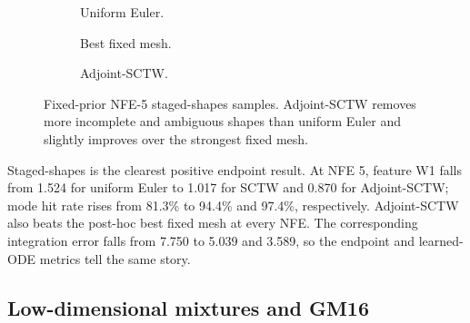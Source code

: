 \begin{table}[t]
  \centering
  \caption{Staged-shapes easy benchmark; feature W1 is lower better. Best fixed is the
  post-hoc minimum over the six early/late/symmetric power meshes and two fixed VSFM meshes at each
  NFE, so it is a deliberately favorable comparator rather than one deployable preselected mesh.}
  \label{tab:staged}
  \resizebox{\linewidth}{!}{%
  }
\end{table}

\begin{figure}[t]
  \centering
  \begin{subfigure}{0.31\linewidth}
    \centering
    \caption{Uniform Euler.}
  \end{subfigure}
  \begin{subfigure}{0.31\linewidth}
    \centering
    \caption{Best fixed mesh.}
  \end{subfigure}
  \begin{subfigure}{0.31\linewidth}
    \centering
    \caption{Adjoint-SCTW.}
  \end{subfigure}
  \caption{Fixed-prior NFE-5 staged-shapes samples. Adjoint-SCTW removes more incomplete and
  ambiguous shapes than uniform Euler and slightly improves over the strongest fixed mesh.}
  \label{fig:staged-samples}
\end{figure}

Staged-shapes is the clearest positive endpoint result. At NFE 5, feature W1 falls from 1.524 for
uniform Euler to 1.017 for SCTW and 0.870 for Adjoint-SCTW; mode hit rate rises from 81.3\% to
94.4\% and 97.4\%, respectively. Adjoint-SCTW also beats the post-hoc best fixed mesh at every NFE.
The corresponding integration error falls from 7.750 to 5.039 and 3.589, so the endpoint and
learned-ODE metrics tell the same story.

\subsection{Low-dimensional mixtures and GM16}
\label{sec:lowdim-results}

